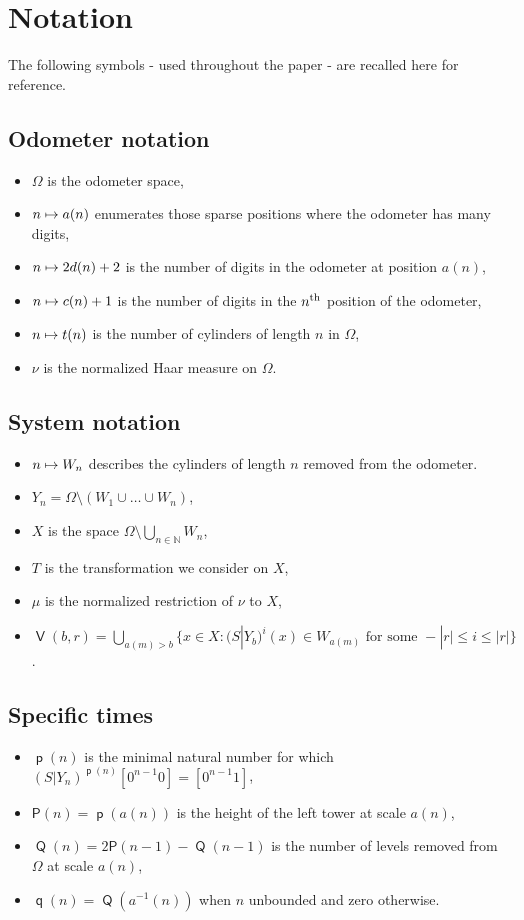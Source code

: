 \documentclass[10pt]{amsart}
\theoremstyle{definition}\newtheorem{defi}[theo]{Definition}\newtheorem{rema}[theo]{Remark}\newtheorem{exam}[theo]{Example}\newtheorem{exem}[theo]{Example}\newtheorem{nota}[theo]{Notation}
\DeclareMathOperator{\bad}{\mathsf{V}}
\DeclareMathOperator{\p}{\mathsf{p}}
\DeclareMathOperator{\q}{\mathsf{q}}
\DeclareMathOperator{\Q}{\mathsf{Q}}
\newcommand{\N}{\mathbb{N}}
\renewcommand{\P}{\mathsf{P}}
\let\oldmapsto\mapsto
\renewcommand*{\mapsto}{\mathchoice{\longmapsto}{\oldmapsto}{\oldmapsto}{\oldmapsto}}
\begin{document}
\section{Notation}

The following symbols - used throughout the paper - are recalled here for reference.

\subsection*{Odometer notation}
\begin{itemize}
\item $\Omega$ is the odometer space,
\item $n \mapsto a(n)$ enumerates those sparse positions where the odometer has many digits,
\item $n \mapsto 2d(n)+2$ is the number of digits in the odometer at position $a(n)$,
\item $n \mapsto c(n) + 1$ is the number of digits in the $n^{\rm th}$ position of the odometer,
\item $n \mapsto t(n)$ is the number of cylinders of length $n$ in $\Omega$,
\item $\nu$ is the normalized Haar measure on $\Omega$.
\end{itemize}

\subsection*{System notation}
\begin{itemize}
\item $n \mapsto W_n$ describes the cylinders of length $n$ removed from the odometer.
\item $Y_n = \Omega \setminus (W_1 \cup \dots \cup W_n)$,
\item $X$ is the space $\Omega \setminus \bigcup_{n \in \N} W_n$,
\item $T$ is the transformation we consider on $X$,
\item $\mu$ is the normalized restriction of $\nu$ to $X$,
\item $\bad(b,r) = \bigcup_{a(m) > b} \{x \in X : (S|Y_b)^i(x) \in W_{a(m)} \text{ for some } -|r| \le i \le |r|\}$.
\end{itemize}


\subsection*{Specific times}
\begin{itemize}
\item $\p(n)$ is the minimal natural number for which $(S|Y_n)^{\p(n)}[0^{n-1} 0] = [0^{n-1} 1]$,
\item $\P(n) = \p(a(n))$ is the height of the left tower at scale $a(n)$,
\item $\Q(n) = 2\P(n-1) - \Q(n-1)$ is the number of levels removed from $\Omega$ at scale $a(n)$,
\item $\q(n) = \Q(a^{-1}(n))$ when $n$ unbounded and zero otherwise.
\end{itemize}
\end{document}
